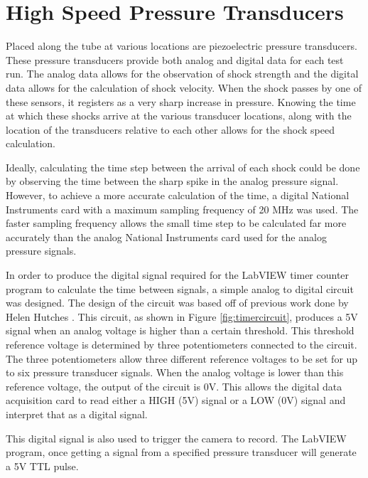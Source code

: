 \section{High Speed Pressure Transducers}

Placed along the tube at various locations are piezoelectric pressure transducers. These pressure transducers provide both analog and digital data for each test run. The analog data allows for the observation of shock strength and the digital data allows for the calculation of shock velocity. When the shock passes by one of these sensors, it registers as a very sharp increase in pressure. Knowing the time at which these shocks arrive at the various transducer locations, along with the location of the transducers relative to each other allows for the shock speed calculation. 

Ideally, calculating the time step between the arrival of each shock could be done by observing the time between the sharp spike in the analog pressure signal. However, to achieve a more accurate calculation of the time, a digital National Instruments card with a maximum sampling frequency of 20 MHz was used. The faster sampling frequency allows the small time step to be calculated far more accurately than the analog National Instruments card used for the analog pressure signals. 

In order to produce the digital signal required for the LabVIEW timer counter program to calculate the time between signals, a simple analog to digital circuit was designed. The design of the circuit was based off of previous work done by Helen Hutches \cite{Hutchens2015}. This circuit, as shown in Figure \ref{fig:timercircuit}, produces a 5V signal when an analog voltage is higher than a certain threshold. This threshold reference voltage is determined by three potentiometers connected to the circuit. The three potentiometers allow three different reference voltages to be set for up to six pressure transducer signals. When the analog voltage is lower than this reference voltage, the output of the circuit is 0V. This allows the digital data acquisition card to read either a HIGH (5V) signal or a LOW (0V) signal and interpret that as a digital signal. 

This digital signal is also used to trigger the camera to record. The LabVIEW program, once getting a signal from a specified pressure transducer will generate a 5V TTL pulse. 


